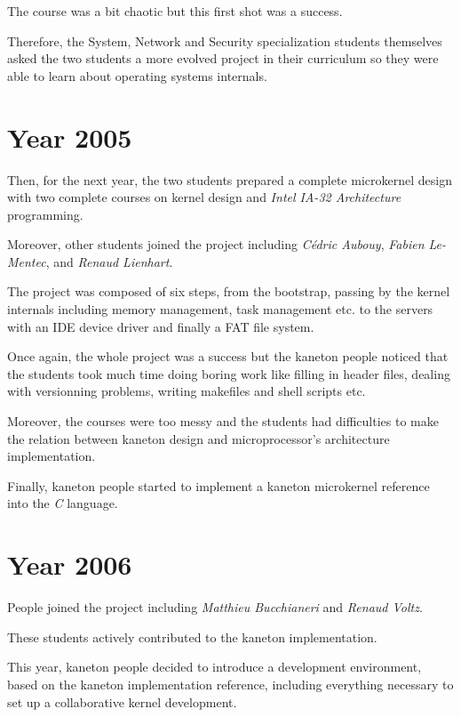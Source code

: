 The course was a bit chaotic but this first shot was a success.

Therefore, the System, Network and Security specialization students
themselves asked the two students a more evolved project in their
curriculum so they were able to learn about operating systems internals.

%
%

\section{Year 2005}

Then, for the next year, the two students prepared a complete microkernel
design with two complete courses on kernel design and \textit{Intel IA-32
Architecture} programming.

Moreover, other students joined the project including \textit{C\'edric Aubouy},
\textit{Fabien Le-Mentec}, and \textit{Renaud Lienhart}.

The project was composed of six steps, from the bootstrap, passing by
the kernel internals including memory management, task management etc.
to the servers with an IDE device driver and finally a FAT file system.

Once again, the whole project was a success but the kaneton people
noticed that the students took much time doing boring work like
filling in header files, dealing with versionning problems, writing
makefiles and shell scripts etc.

Moreover, the courses were too messy and the students had difficulties
to make the relation between kaneton design and microprocessor's
architecture implementation.

Finally, kaneton people started to implement a kaneton microkernel
reference into the \textit{C} language.

%
%

\section{Year 2006}

People joined the project including \textit{Matthieu Bucchianeri} and
\textit{Renaud Voltz}.

These students actively contributed to the kaneton implementation.

This year, kaneton people decided to introduce a development environment,
based on the kaneton implementation reference, including everything
necessary to set up a collaborative kernel development.

